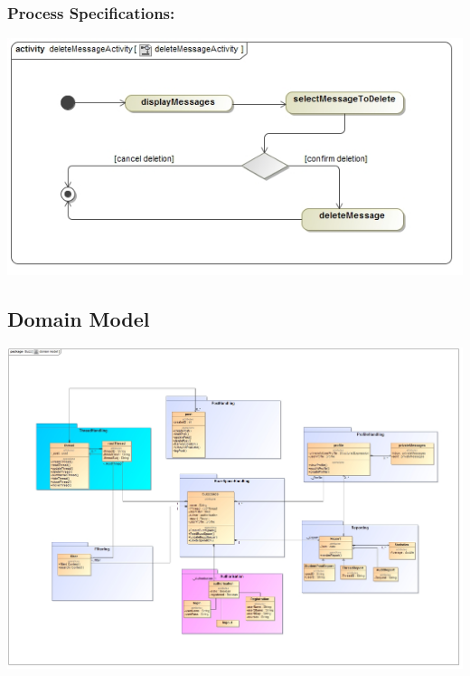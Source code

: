 \documentclass[a4paper,11pt]{article}
\begin{document}
\subsubsection{Process Specifications:} 
\includegraphics[width=1\linewidth]{./Images/PrivateMessage/deleteMessageActivity}

\newpage
\begin{center}
\section{\textbf{\huge{Domain Model}}}

\end{center}
\includegraphics[width=1\linewidth]{./Images/Domain/domainmodel.jpg}
\end{document}
